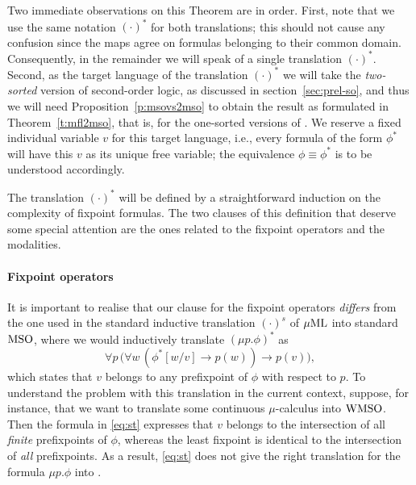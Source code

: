 Two immediate observations on this Theorem are in order.
First, note that we use the same notation $(\cdot)^{*}$ for both translations; 
this should not cause any confusion since the maps agree on formulas belonging 
to their common domain.
Consequently, in the remainder we will speak of a single translation 
$(\cdot)^{*}$.
Second, as the target language of the translation $(\cdot)^{*}$ we will take 
the \emph{two-sorted} version of second-order logic, as discussed in 
section~\ref{sec:prel-so}, and thus we will need Proposition~\ref{p:msovs2mso}
to obtain the result as formulated in Theorem~\ref{t:mfl2mso}, that is,
for the one-sorted versions of \mso.
We reserve a fixed individual variable $v$ for this target language, i.e., 
every formula of the form $\phi^{*}$ will have this $v$ as its unique free 
variable; the equivalence $\phi \equiv \phi^{*}$ is to be understood accordingly.

The translation $(\cdot)^{*}$ will be defined by a straightforward induction on
the complexity of fixpoint formulas.
The two clauses of this definition that deserve some special attention are the
ones related to the fixpoint operators and the modalities.

\paragraph{Fixpoint operators} 
It is important to realise that our clause for the fixpoint operators
\emph{differs} from the one used in the standard inductive translation 
$(\cdot)^{s}$ of $\mu\mathrm{ML}$ into standard $\mathrm{MSO}$, where we would inductively
translate $(\mu p. \phi)^{*}$ as
\begin{equation}
\label{eq:st}
\forall p\, \big( \forall w\, (\phi^{*}[w/v] \to p(w)) \to p(v) \big),
\end{equation}
which states that $v$ belongs to any prefixpoint of $\phi$ with respect to $p$.
To understand the problem with this translation in the current context, suppose,
for instance, that we want to translate some continuous $\mu$-calculus into
$\mathrm{WMSO}$.
Then the formula in \eqref{eq:st} expresses that $v$ 
belongs to the intersection of all \emph{finite} prefixpoints of $\phi$, whereas
the least fixpoint is identical to the intersection of \emph{all} prefixpoints.
As a result, \eqref{eq:st} does not give the right translation for the formula 
$\mu p.\phi$ into \wmso.

